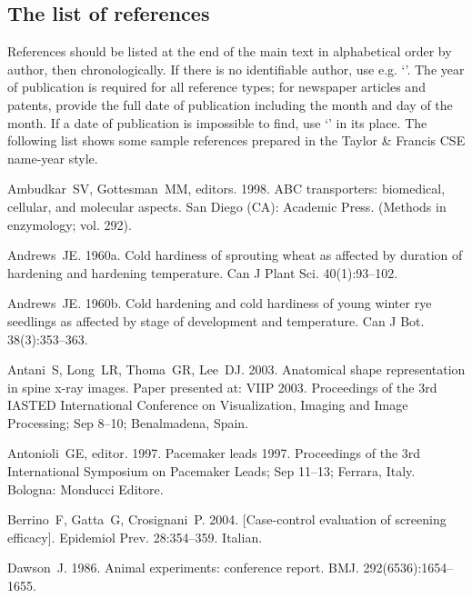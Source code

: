 \documentclass[]{interact}
\theoremstyle{plain}%
\theoremstyle{definition}
\theoremstyle{remark}
\begin{document}
\subsection{The list of references}

References should be listed at the end of the main text in alphabetical order by author, then chronologically.
If there is no identifiable author, use e.g. `\citep{Hbk00}'.
The year of publication is required for all reference types; for newspaper articles and patents, provide the full date of publication including the month and day of the month.
If a date of publication is impossible to find, use `\citeyear{LedND}' in its place. The following list shows some sample references prepared in the Taylor \& Francis CSE name-year style.

\begin{thebibliography}{}

Ambudkar~SV, Gottesman~MM, editors. 1998. ABC transporters: biomedical,
  cellular, and molecular aspects. San Diego (CA): Academic Press. (Methods
  in enzymology; vol. 292).

Andrews~JE. 1960a. Cold hardiness of sprouting wheat as affected by duration of
  hardening and hardening temperature. Can J Plant Sci. 40(1):93--102.

Andrews~JE. 1960b. Cold hardening and cold hardiness of young winter rye
  seedlings as affected by stage of development and temperature. Can J Bot.
  38(3):353--363.

Antani~S, Long~LR, Thoma~GR, Lee~DJ. 2003. Anatomical shape representation in
  spine x-ray images. Paper presented at: VIIP 2003. Proceedings of the
  3rd IASTED International Conference on Visualization, Imaging and
  Image Processing; Sep 8--10; Benalmadena, Spain.

Antonioli~GE, editor. 1997. Pacemaker leads 1997. Proceedings of the 3rd
  International Symposium on Pacemaker Leads; Sep 11--13; Ferrara, Italy.
  Bologna: Monducci Editore.

Berrino~F, Gatta~G, Crosignani~P. 2004. [Case-control evaluation of screening
  efficacy]. Epidemiol Prev. 28:354--359. Italian.

Dawson~J. 1986. Animal experiments: conference report. BMJ.
  292(6536):1654--1655.


\end{thebibliography}
\end{document}
